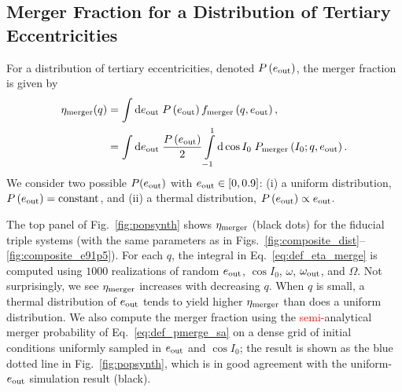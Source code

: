 \documentclass[
        fleqn,
        usenatbib,
    ]{mnras}
\newcommand*{\p}[1]{\left(#1\right)}
\begin{document}
\subsection{Merger Fraction for a Distribution of Tertiary Eccentricities}

For a distribution of tertiary eccentricities, denoted $P\p{e_{\rm out}}$, the
merger fraction is given by
\begin{align}
    \eta_{\rm merger}(q) &= \int \mathrm{d}e_{\rm out}\;
            P\p{e_{\rm out}} f_{\rm merger}\p{q, e_{\rm out}},\nonumber\\
        &= \int\limits\mathrm{d} e_{\rm out}\; \frac{P\p{e_{\rm out}}}{2}
            \int\limits_{-1}^1\mathrm{d} \cos I_0\; P_{\rm merger}\p{I_0; q,
            e_{\rm out}}.
        \label{eq:def_eta_merge}
\end{align}
We consider two possible $P(e_{\rm out})$ with $e_{\rm out} \in [0, 0.9]$: (i) a
uniform distribution, $P\p{e_{\rm out}} = \textrm{constant}$, and (ii) a thermal
distribution, $P\p{e_{\rm out}} \propto e_{\rm out}$.

The top panel of Fig.~\ref{fig:popsynth} shows $\eta_{\rm merger}$ (black
dots) for the fiducial triple systems (with the same parameters as in
Figs.~\ref{fig:composite_dist}--\ref{fig:composite_e91p5}). For each $q$, the
integral in Eq.~\eqref{eq:def_eta_merge} is computed using $1000$ realizations
of random $e_{\rm out}$, $\cos I_0$, $\omega$, $\omega_{\rm out}$, and
$\Omega$. Not surprisingly, we see $\eta_{\rm merger}$ increases with decreasing
$q$. When $q$ is small, a thermal distribution of $e_{\rm out}$ tends to yield
higher $\eta_{\rm merger}$ than does a uniform distribution. We also compute the
merger fraction using the \textcolor{red}{semi-}analytical merger probability of
Eq.~\eqref{eq:def_pmerge_sa} on a dense grid of initial conditions uniformly
sampled in $e_{\rm out}$ and $\cos I_0$; the result is shown as the blue dotted
line in Fig.~\ref{fig:popsynth}, which is in good agreement with the
uniform-$e_{\rm out}$ simulation result (black).
\end{document}

